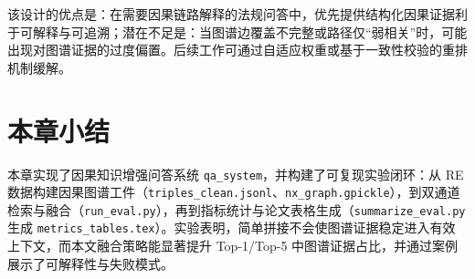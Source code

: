 该设计的优点是：在需要因果链路解释的法规问答中，优先提供结构化因果证据利于可解释与可追溯；潜在不足是：当图谱边覆盖不完整或路径仅“弱相关”时，可能出现对图谱证据的过度偏置。后续工作可通过自适应权重或基于一致性校验的重排机制缓解。

\section{本章小结}
\label{sec:qa_summary}

本章实现了因果知识增强问答系统 \texttt{qa\_system}，并构建了可复现实验闭环：从 RE 数据构建因果图谱工件（\texttt{triples\_clean.jsonl}、\texttt{nx\_graph.gpickle}），到双通道检索与融合（\texttt{run\_eval.py}），再到指标统计与论文表格生成（\texttt{summarize\_eval.py} 生成 \texttt{metrics\_tables.tex}）。实验表明，简单拼接不会使图谱证据稳定进入有效上下文，而本文融合策略能显著提升 Top-1/Top-5 中图谱证据占比，并通过案例展示了可解释性与失败模式。

